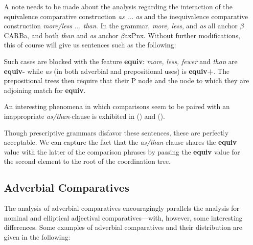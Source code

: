 A note needs to be made about the analysis regarding the interaction
of the equivalence comparative construction {\it as ... as} and the
inequivalence comparative construction {\it more/less ... than}.  In
the grammar, {\it more, less}, and {\it as} all anchor $\beta$CARBa, and
both {\it than} and {\it as} anchor $\beta$axPnx.  Without further
modifications, this of course will give us sentences such as the
following:


\noindent Such cases are blocked with the feature {\bf equiv}:  {\it
more, less, fewer} and {\it than} are {\bf equiv-} while {\it as} (in
both adverbial and prepositional uses) is {\bf equiv+}.  The
prepositional trees then require that their P node and the node to
which they are adjoining match for {\bf equiv}.

An interesting phenomena in which comparisons seem to be paired with
an inappropriate {\it as/than}-clause is exhibited in () and
().


\noindent Though prescriptive grammars disfavor these sentences, these
are perfectly acceptable.  We can capture the fact that the {\it
as/than}-clause shares the {\bf equiv} value with the latter of the
comparison phrases by passing the {\bf equiv} value for the second
element to the root of the coordination tree.


\subsection{Adverbial Comparatives}

The analysis of adverbial comparatives encouragingly parallels the
analysis for nominal and elliptical adjectival comparatives---with,
however, some interesting differences.  Some examples of adverbial
comparatives and their distribution are given in the following:


